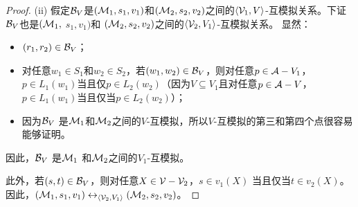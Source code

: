 \begin{proof}
	
 (ii) 假定${\cal B}_{V}$是$({\cal M}_1,s_1,v_1)$和$({\cal M}_2,s_2,v_2)$之间的${{\langle{{\cal V}_1,V}\rangle}}$-互模拟关系。下证${\cal B}_{V}$也是$({\cal M}_1,$ $s_1,v_1)$和 $({\cal M}_2,s_2,v_2)$之间的${{\langle{{\cal V}_2,V_1}\rangle}}$-互模拟关系。
		显然：
		\begin{itemize}
			\item $(r_1, r_2) \in {\cal B}_{V}$；
			\item 对任意$w_1\in S_1$和$w_2\in S_2$，若$(w_1, w_2) \in {\cal B}_{V}$，则对任意$p \in {\cal A} - V_1$，
			$p\in L_1(w_1)$当且仅$p\in L_2(w_2)$（因为$V \subseteq V_1$且对任意$p \in {\cal A} - V$，$p\in L_1(w_1)$当且仅当$p\in L_2(w_2)$）；
			\item 因为${\cal B}_{V}$ 是${\cal M}_1$和${\cal M}_2$之间的$V$-互模拟，所以$V$-互模拟的第三和第四个点很容易能够证明。
	\end{itemize}
	因此，${\cal B}_{V}$ 是${\cal M}_1$ 和${\cal M}_2$之间的$V_1$-互模拟。
	
	此外，若$(s,t) \in {\cal B}_V$，则对任意$X\in {\cal V}-{\cal V}_2$，$s \in v_1(X)$ 当且仅当$t \in v_2(X)$。因此，$({\cal M}_1, s_1, v_1) \leftrightarrow_{{\langle{{\cal V}_2,V_1}\rangle}} ({\cal M}_2,s_2,v_2)$。
	

\end{proof}
